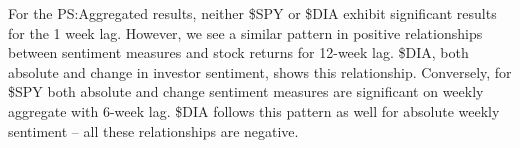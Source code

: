 For the PS:Aggregated results, neither \$SPY or \$DIA exhibit significant results for the 1 week lag. However, we see a similar pattern in positive relationships between sentiment measures and stock returns for 12-week lag. \$DIA, both absolute and change in investor sentiment, shows this relationship. 
Conversely, for \$SPY both absolute and change sentiment measures are significant on weekly aggregate with 6-week lag. \$DIA follows this pattern as well for absolute weekly sentiment – all these relationships are negative.

